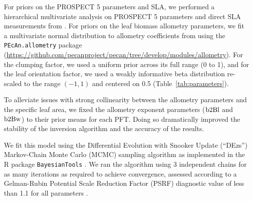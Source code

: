 For priors on the PROSPECT 5 parameters and SLA, we performed a hierarchical multivariate analysis \citep{shiklomanov2020does} on PROSPECT 5 parameters and direct SLA measurements from \citep[][Chapter 3]{shiklomanov_dissertation}.
For priors on the leaf biomass allometry parameters, we fit a multivariate normal distribution to allometry coefficients from \citet{jenkins2003nationalscale,jenkins2004comprehensive} using the \texttt{PEcAn.allometry} package (\url{https://github.com/pecanproject/pecan/tree/develop/modules/allometry}).
For the clumping factor, we used a uniform prior across its full range (0 to 1), and for the leaf orientation factor, we used a weakly informative beta distribution re-scaled to the range $(-1, 1)$ and centered on 0.5 (Table~\ref{tab:parameters}).

To alleviate issues with strong collinearity between the allometry parameters and the specific leaf area, we fixed the allometry exponent parameters ($\mathrm{b2Bl}$ and $\mathrm{b2Bw}$) to their prior means for each PFT.
Doing so dramatically improved the stability of the inversion algorithm and the accuracy of the results.

We fit this model using the Differential Evolution with Snooker Update (``DEzs'') Markov-Chain Monte Carlo (MCMC) sampling algorithm \citep{terbraak2008differential} as implemented in the R package \texttt{BayesianTools} \citep{bayesiantools}.
We ran the algorithm using 3 independent chains for as many iterations as required to achieve convergence, assessed according to a Gelman-Rubin Potential Scale Reduction Factor (PSRF) diagnostic value of less than 1.1 for all parameters \citep{gelman1992inference}.

